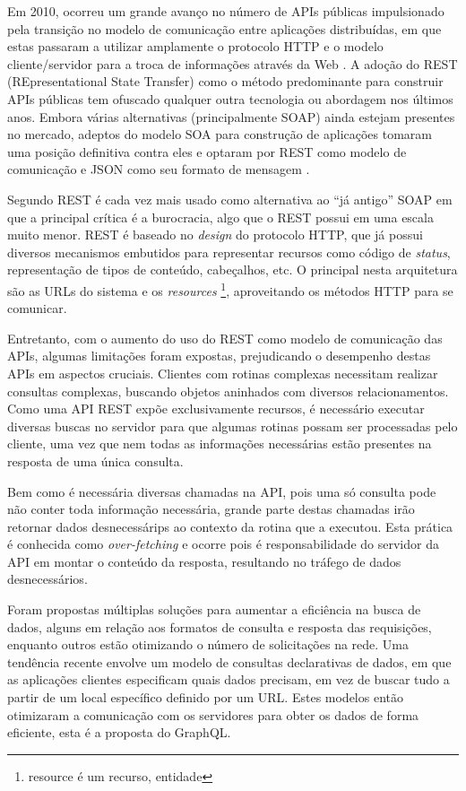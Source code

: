 Em 2010, ocorreu um grande avanço no número de APIs públicas impulsionado pela transição no modelo de comunicação entre aplicações distribuídas, em que estas passaram a utilizar amplamente o protocolo HTTP e o modelo cliente/servidor para a troca de informações através da Web \cite{tcc-ufsc}. A adoção do REST (REpresentational State Transfer) como o método predominante para construir APIs públicas tem ofuscado qualquer outra tecnologia ou abordagem nos últimos anos. Embora várias alternativas (principalmente SOAP) ainda estejam presentes no mercado, adeptos do modelo SOA para construção de aplicações tomaram uma posição definitiva contra eles e optaram por REST como modelo de comunicação e JSON como seu formato de mensagem \cite{programmableweb-rest-losing}.

Segundo  REST é cada vez mais usado como alternativa ao “já antigo” SOAP em que a principal crítica é a burocracia, algo que o REST possui em uma escala muito menor. REST é baseado no \textit{design} do protocolo HTTP, que já possui diversos mecanismos embutidos para representar recursos como código de \textit{status}, representação de tipos de conteúdo, cabeçalhos, etc. O principal nesta arquitetura são as URLs do sistema e os \textit{resources} \footnote{resource é um recurso, entidade}, aproveitando os métodos HTTP para se comunicar.

Entretanto, com o aumento do uso do REST como modelo de comunicação das APIs, algumas limitações foram expostas, prejudicando o desempenho destas APIs em aspectos cruciais. Clientes com rotinas complexas necessitam realizar consultas complexas, buscando objetos aninhados com diversos relacionamentos. Como uma API REST expõe exclusivamente recursos, é necessário executar diversas buscas no servidor para que algumas rotinas possam ser processadas pelo cliente, uma vez que nem todas as informações necessárias estão presentes na resposta de uma única consulta.

Bem como é necessária diversas chamadas na API, pois uma só consulta pode não conter toda informação necessária, grande parte destas chamadas irão retornar dados desnecessárips ao contexto da rotina que a executou. Esta prática é conhecida como \textit{over-fetching} e ocorre pois é responsabilidade do servidor da API em montar o conteúdo da resposta, resultando no tráfego de dados desnecessários.

Foram propostas múltiplas soluções para aumentar a eficiência na busca de dados, alguns em relação aos formatos de consulta e resposta das requisições, enquanto outros estão otimizando o número de solicitações na rede. Uma tendência recente envolve um modelo de consultas declarativas de dados, em que as aplicações clientes especificam quais dados precisam, em vez de buscar tudo a partir de um local específico definido por um URL. Estes modelos então otimizaram a comunicação com os servidores para obter os dados de forma eficiente, esta é a proposta do GraphQL.

